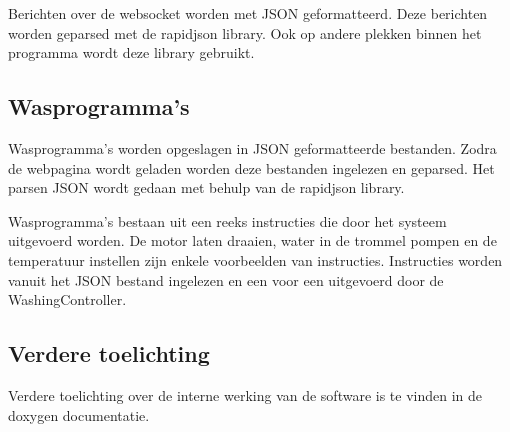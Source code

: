 Berichten over de websocket worden met JSON geformatteerd. Deze berichten worden geparsed met de rapidjson library. Ook op andere plekken binnen het programma wordt deze library gebruikt.

\subsection{Wasprogramma's}
Wasprogramma's worden opgeslagen in JSON geformatteerde bestanden. Zodra de webpagina wordt geladen worden deze bestanden ingelezen en geparsed. Het parsen JSON wordt gedaan met behulp van de rapidjson library. 

Wasprogramma's bestaan uit een reeks instructies die door het systeem uitgevoerd worden. De motor laten draaien, water in de trommel pompen en de temperatuur instellen zijn enkele voorbeelden van instructies. Instructies worden vanuit het JSON bestand ingelezen en een voor een uitgevoerd door de WashingController.


\subsection*{Verdere toelichting}
Verdere toelichting over de interne werking van de software is te vinden in de doxygen documentatie.
